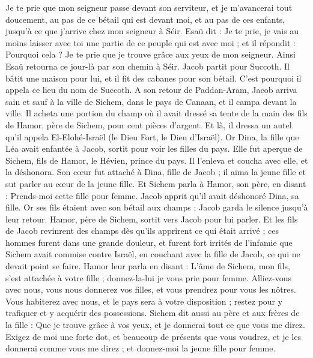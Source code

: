 \begin{multicols}{2}
Je te prie que mon seigneur passe devant son serviteur, et je m’avancerai tout doucement, au pas de ce bétail qui est devant moi, et au pas de ces enfants, jusqu'à ce que j'arrive chez mon seigneur à Séir.
Esaü dit : Je te prie, je vais au moins laisser avec toi une partie de ce peuple qui est avec moi ; et il répondit : Pourquoi cela ? Je te prie que je trouve grâce aux yeux de mon seigneur.
Ainsi Esaü  retourna ce jour-là par son chemin à Séir.
Jacob partit pour Succoth. Il bâtit une maison pour lui, et il fit des cabanes pour son bétail. C’est pourquoi il appela ce lieu du nom de Succoth.
A son retour de  Paddan-Aram, Jacob arriva sain et sauf à la ville de Sichem, dans le pays de Canaan, et il campa devant la ville.
Il acheta une portion du champ où il avait dressé sa tente de la main des fils de Hamor, père de Sichem, pour cent pièces d'argent.
Et là, il dressa un autel qu'il appela El-Elohé-Israël (le Dieu Fort, le Dieu d'Israël).
\VerseOne{}Or Dina, la fille que Léa avait enfantée à Jacob, sortit pour voir les filles du pays.
Elle fut aperçue de Sichem, fils de Hamor, le Hévien, prince du pays. Il l'enleva et coucha avec elle, et la déshonora.
Son cœur fut attaché à Dina, fille de Jacob ; il aima la jeune fille et sut parler au cœur de la jeune fille.
Et Sichem parla à Hamor, son père, en disant : Prends-moi cette fille pour femme.
Jacob apprit qu'il avait déshonoré Dina, sa fille. Or ses fils étaient avec son bétail aux champs ; Jacob garda le silence jusqu’à leur retour.
Hamor, père de Sichem, sortit vers Jacob pour lui  parler.
Et les fils de Jacob revinrent des champs dès qu’ils apprirent ce qui était arrivé ; ces hommes furent dans  une grande douleur, et furent fort irrités de l'infamie que Sichem avait commise contre Israël, en couchant avec la fille de Jacob, ce qui ne devait point se faire.
Hamor leur parla en disant : L’âme de Sichem, mon fils, s’est attachée à votre fille ; donnez-la-lui je vous prie pour femme.
Alliez-vous avec nous, vous nous donnerez vos filles, et vous prendrez pour vous les nôtres.
Vous habiterez avec nous, et le pays sera à votre disposition ; restez pour y trafiquer et y acquérir des possessions.
Sichem dit aussi au père et aux frères de la fille : Que je trouve grâce à vos yeux, et je donnerai tout ce que vous me direz.
Exigez de moi une forte dot, et beaucoup de présents que vous voudrez, et je les donnerai comme vous me direz ; et donnez-moi la jeune fille pour femme.

\end{multicols}
